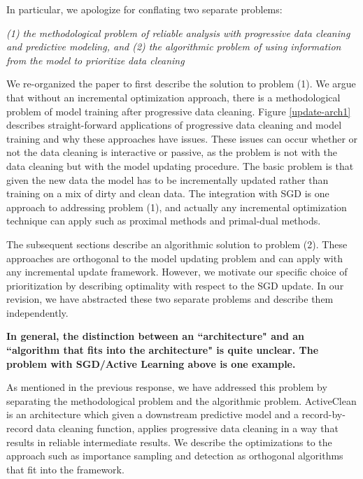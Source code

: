 In particular, we apologize for conflating two separate problems:

\vspace{0.25em}

\emph{(1) the methodological problem of reliable analysis with progressive data cleaning and predictive modeling, and (2) the algorithmic problem of using information from the model to prioritize data cleaning} 

\vspace{0.25em}

We re-organized the paper to first describe the solution to problem (1). We argue that without an incremental optimization approach, there is a methodological problem of model training after progressive data cleaning. Figure \ref{update-arch1} describes straight-forward applications of progressive data cleaning and model training and why these approaches have issues.
These issues can occur whether or not the data cleaning is interactive or passive, as the problem is not with the data cleaning but with the model updating procedure.
The basic problem is that given the new data the model has to be incrementally updated rather than training on a mix of dirty and clean data.
The integration with SGD is one approach to addressing problem (1), and actually any incremental optimization technique can apply such as proximal methods and primal-dual methods.


The subsequent sections describe an algorithmic solution to problem (2). These approaches are orthogonal to the model updating problem and can apply with any incremental update framework. However, we motivate our specific choice of prioritization by describing optimality with respect to the SGD update.
In our revision, we have abstracted these two separate problems and describe them independently.


\vspace{0.25em}

\textbf{In general, the distinction between an ``architecture" and an ``algorithm that fits into the architecture" is quite unclear. The problem with SGD/Active Learning above is one example.}

As mentioned in the previous response, we have addressed this problem by separating the methodological problem and the algorithmic problem. ActiveClean is an architecture which given a downstream predictive model and a record-by-record data cleaning function, applies progressive data cleaning in a way that results in reliable intermediate results.
We describe the optimizations to the approach such as importance sampling and detection as orthogonal algorithms that fit into the framework.

